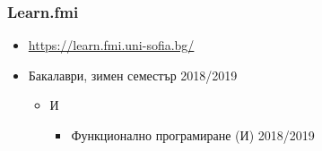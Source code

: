 \documentclass{beamer}
\begin{document}
\begin{frame}
  \frametitle{Learn.fmi}
  
  \begin{itemize}
  \item \url{https://learn.fmi.uni-sofia.bg/}
  \item Бакалаври, зимен семестър 2018/2019
    \begin{itemize}
    \item И
      \begin{itemize}
      \item Функционално програмиране (И) 2018/2019
      \end{itemize}
    \end{itemize}
  \end{itemize}
\end{frame}
\end{document}
